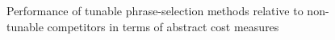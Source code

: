 \begin{figure}[!ht]
    \centering  
    \quad
    
    \caption{Performance of tunable phrase-selection methods relative to non-tunable competitors in terms of abstract cost measures}
    
    \label{fig:non-tunable}
\end{figure}

